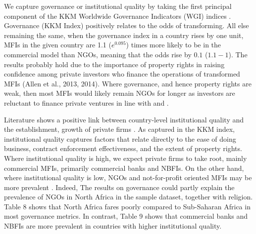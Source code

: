 \documentclass[a4paper,nobind]{templates/ociamthesis}
\begin{document}
We capture governance or institutional quality by taking the first principal component of the KKM Worldwide Governance Indicators (WGI) indices \autocite{kraay2010worldwide}. Governance (KKM Index) positively relates to the odds of transforming. All else remaining the same, when the governance index in a country rises by one unit, MFIs in the given country are 1.1 (\(e^{0.095}\)) times more likely to be in the commercial model than NGOs, meaning that the odds rise by \(0.1\) (\(1.1 - 1\)). The results probably hold due to the importance of property rights in raising confidence among private investors who finance the operations of transformed MFIs (Allen et al., 2013, 2014). Where governance, and hence property rights are weak, then most MFIs would likely remain NGOs for longer as investors are reluctant to finance private ventures in line with \textcite{johnson2002property} and \textcite{claessens2003financial}.

Literature shows a positive link between country-level institutional quality and the establishment, growth of private firms \autocite{sobel2008testing}. As captured in the KKM index, institutional quality captures factors that relate directly to the ease of doing business, contract enforcement effectiveness, and the extent of property rights. Where institutional quality is high, we expect private firms to take root, mainly commercial MFIs, primarily commercial banks and NBFIs. On the other hand, where institutional quality is low, NGOs and not-for-profit oriented MFIs may be more prevalent \autocite{kuzey2021link}. Indeed, The results on governance could partly explain the prevalence of NGOs in North Africa in the sample dataset, together with religion. Table 8 shows that North Africa fares poorly compared to Sub-Saharan Africa in most governance metrics. In contrast, Table 9 shows that commercial banks and NBFIs are more prevalent in countries with higher institutional quality.
\end{document}
